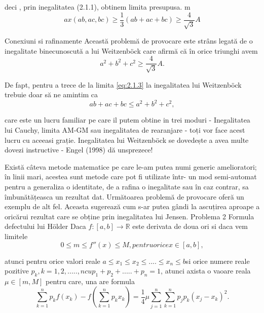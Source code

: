 \documentclass[a4paper,12pt,oneside]{report}
\begin{document}
deci , prin inegalitatea (2.1.1), obtinem limita presupusa. 
m\begin{displaymath}
  ax \left ( ab, ac, bc \right )\geq \frac{1}{3}\left ( ab + ac + bc \right )\geq \frac{4}{\sqrt{3}}A \label{eq:2.1.3} \tag{2.1.3}
\end{displaymath}

Conexiuni si rafinamente 
Această problemă de provocare este strâns legată de o inegalitate binecunoscută a lui Weitzenböck care afirmă că în orice triunghi avem 
\begin{displaymath}
  a^{2} + b^{2} + c^{2} \geq \frac{4}{\sqrt{3}}A . \label{eq:2.1.4} \tag{2.1.4}
\end{displaymath}

De fapt, pentru a trece de la limita \ref{eq:2.1.3} la inegalitatea lui Weitzenböck trebuie doar să ne amintim ca 
\begin{displaymath}
  ab + ac + bc \leq a^{2} + b^{2} + c^{2}, 
\end{displaymath}

care este un lucru familiar pe care il putem obtine in trei moduri  - Inegalitatea lui Cauchy, limita AM-GM sau inegalitatea de rearanjare -  toți vor face acest lucru cu aceeasi grație.
	Inegalitatea lui Weitzenböck se dovedește a avea multe dovezi instructive - Engel (1998) dă unsprezece! 

Există câteva metode matematice pe care le-am putea numi generic amelioratori; în linii mari, acestea sunt metode care pot fi utilizate într- un mod semi-automat pentru a generaliza o identitate, de a rafina o inegalitate sau în caz contrar, sa îmbunătățeasca un rezultat dat. 
Următoarea problemă de provocare oferă un exemplu de alt fel. Aceasta sugerează cum s-ar putea gândi la ascuțirea aproape a oricărui rezultat care se obține prin inegalitatea lui Jensen.
Problema 2
Formula defectului lui Hölder
Daca \(f : \left [ a,b  \right ] \to \mathbb{R}\) este derivata de doua ori si daca vem limitele 
\begin{displaymath}
  0 \leq m \leq  f''\left ( x \right ) \leq  M , pentru orice x\in \left [ a,b \right ], \label{eq:2.2.1} \tag{2.2.1}
\end{displaymath}

atunci pentru orice valori reale \(a\leq x_{1}\leq x_{2}\leq ....\leq x_{n} \leq b \)si orice numere reale pozitive \(p_{k}, k= 1,2,.....,n  cu p_{1} + p_{2} + .....+ p_{n} = 1\), atunci axista o vaoare reala \(\mu \in \left [ m, M \right ]\) pentru care, una are formula
\begin{displaymath}
  \sum_{k = 1}^{n}p_{k}f\left ( x_{k} \right ) - f\left ( \sum_{k = 1}^{n} p_{k}x_{k}\right ) = \frac{1}{4}\mu \sum_{j = 1}^{n}\sum_{k = 1}^{n}p_{j}p_{k}\left ( x_{j} - x_{k} \right )^{2}. \label{eq:2.2.2} \tag{2.2.2}
\end{displaymath}
\end{document}
